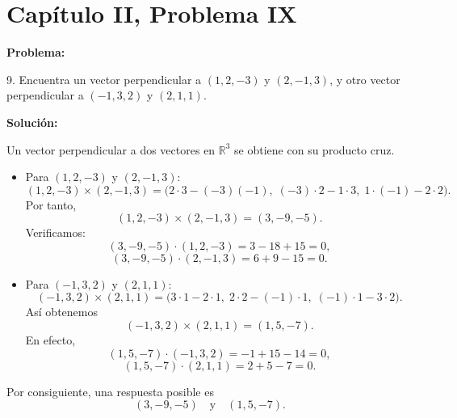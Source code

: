 \section*{Capítulo II, Problema IX}

\textbf{Problema:}

9. Encuentra un vector perpendicular a $(1,2,-3)$ y $(2,-1,3)$, y otro vector perpendicular a $(-1,3,2)$ y $(2,1,1)$.

\textbf{Solución:}

Un vector perpendicular a dos vectores en $\mathbb{R}^3$ se obtiene con su producto cruz.

\begin{itemize}
    \item Para $(1,2,-3)$ y $(2,-1,3)$:
    \[
        (1,2,-3) \times (2,-1,3)
        = \bigl(2\cdot 3 - (-3)(-1),\; (-3)\cdot 2 - 1\cdot 3,\; 1\cdot (-1) - 2\cdot 2\bigr).
    \]
    Por tanto,
    \[
        (1,2,-3) \times (2,-1,3) = (3,-9,-5).
    \]
    Verificamos:
    \[
        (3,-9,-5) \cdot (1,2,-3) = 3 - 18 + 15 = 0,
    \]
    \[
        (3,-9,-5) \cdot (2,-1,3) = 6 + 9 - 15 = 0.
    \]

    \item Para $(-1,3,2)$ y $(2,1,1)$:
    \[
        (-1,3,2) \times (2,1,1)
        = \bigl(3\cdot 1 - 2\cdot 1,\; 2\cdot 2 - (-1)\cdot 1,\; (-1)\cdot 1 - 3\cdot 2\bigr).
    \]
    Así obtenemos
    \[
        (-1,3,2) \times (2,1,1) = (1,5,-7).
    \]
    En efecto,
    \[
        (1,5,-7) \cdot (-1,3,2) = -1 + 15 - 14 = 0,
    \]
    \[
        (1,5,-7) \cdot (2,1,1) = 2 + 5 - 7 = 0.
    \]
\end{itemize}

Por consiguiente, una respuesta posible es
\[
    (3,-9,-5) \quad \text{y} \quad (1,5,-7).
\]